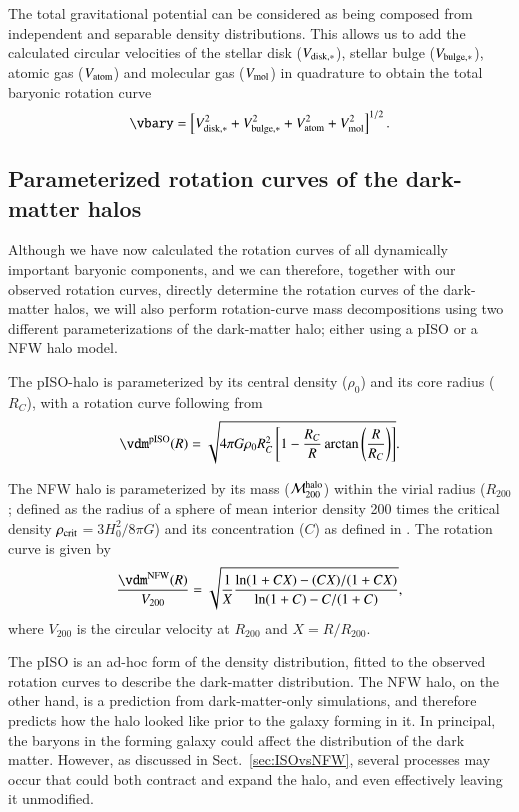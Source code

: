 \documentclass[traditabstract]{aa} %
\begin{document}
The total gravitational potential can be considered as being composed from independent and
separable density distributions. This allows us to add the calculated circular velocities
of the stellar disk ($V_{\rm disk,\ast}$), stellar bulge ($V_{\rm bulge,\ast}$),
atomic gas ($V_{\rm atom}$) and molecular gas ($V_{\rm mol}$) in quadrature to obtain the
total baryonic rotation curve
%
\begin{equation}
%
\vbary = \left[ V_{\rm disk,\ast}^2 + V_{\rm bulge,\ast}^2 + 
V_{\rm atom}^2 + V_{\rm mol}^2\right]^{1/2}.
%
\label{eq:Vbary}
%
\end{equation}


\subsection{Parameterized rotation curves of the dark-matter halos}
\label{sec:DM-RCs}
Although we have now calculated the rotation curves of all dynamically important
baryonic components, and we can therefore, together with our observed rotation curves,
directly determine the rotation curves of the dark-matter halos, we will also perform
rotation-curve mass decompositions using two different parameterizations of the
dark-matter halo; either using a pISO or a NFW halo model.

The pISO-halo is parameterized by its central density ($\rho_0$) and its core radius 
($R_C$), with a rotation curve following from
%
\begin{equation}
%
\vdm^{\rm pISO}(R) = \sqrt{4\pi G \rho_0 R_C^2\left[1-\frac{R_C}{R} 
\arctan\left(\frac{R}{R_C}\right)\right]}.
%
\label{eq:pISO}
%
\end{equation}

The NFW halo is parameterized by its mass ($\mathcal{M}_{200}^{\rm halo}$) within the 
virial radius ($R_{200}$; defined as the radius of a sphere of mean interior density 200
times the critical density $\rho_{\rm crit}$$=$$3H_{0}^{2}/8 \pi G$) and its concentration
($C$) as defined in \cite{NFW1997}. The rotation curve is given by
%
\begin{equation}
%
\frac{\vdm^{\rm NFW}(R)}{V_{200}} = \sqrt{\frac{1}{X} 
\frac{\ln(1+CX)-(CX)/(1+CX)}{\ln(1+C)-C/(1+C)}},
%
\label{eq:NFW}
%
\end{equation}
%
where $V_{200}$ is the circular velocity at $R_{200}$ and $X$$=$$R/R_{200}$.

The pISO is an ad-hoc form of the density distribution, fitted to the observed rotation
curves to describe the dark-matter distribution. The NFW halo, on the other hand, is a
prediction from dark-matter-only simulations, and therefore predicts how the halo looked
like prior to the galaxy forming in it. In principal, the baryons in the forming galaxy
could affect the distribution of the dark matter.
However, as discussed in Sect.~\ref{sec:ISOvsNFW}, several processes may occur that could
both contract and expand the halo, and even effectively leaving it unmodified.
\end{document}
